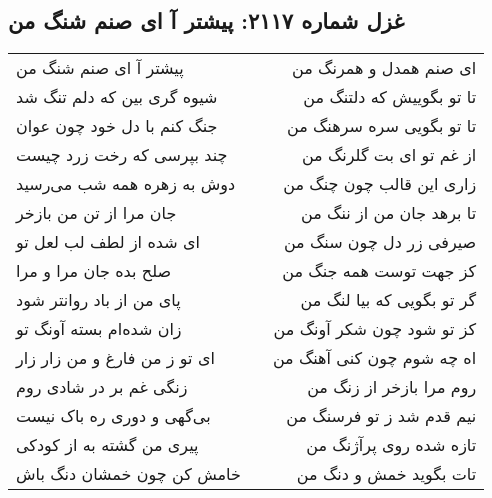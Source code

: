\begin{center}
\section*{غزل شماره ۲۱۱۷: پیشتر آ ای صنم شنگ من}
\label{sec:2117}
\begin{longtable}{l p{0.5cm} r}
پیشتر آ ای صنم شنگ من
&&
ای صنم همدل و همرنگ من
\\
شیوه گری بین که دلم تنگ شد
&&
تا تو بگوییش که دلتنگ من
\\
جنگ کنم با دل خود چون عوان
&&
تا تو بگویی سره سرهنگ من
\\
چند بپرسی که رخت زرد چیست
&&
از غم تو ای بت گلرنگ من
\\
دوش به زهره همه شب می‌رسید
&&
زاری این قالب چون چنگ من
\\
جان مرا از تن من بازخر
&&
تا برهد جان من از ننگ من
\\
ای شده از لطف لب لعل تو
&&
صیرفی زر دل چون سنگ من
\\
صلح بده جان مرا و مرا
&&
کز جهت توست همه جنگ من
\\
پای من از باد روانتر شود
&&
گر تو بگویی که بیا لنگ من
\\
زان شده‌ام بسته آونگ تو
&&
کز تو شود چون شکر آونگ من
\\
ای تو ز من فارغ و من زار زار
&&
اه چه شوم چون کنی آهنگ من
\\
زنگی غم بر در شادی روم
&&
روم مرا بازخر از زنگ من
\\
بی‌گهی و دوری ره باک نیست
&&
نیم قدم شد ز تو فرسنگ من
\\
پیری من گشته به از کودکی
&&
تازه شده روی پرآژنگ من
\\
خامش کن چون خمشان دنگ باش
&&
تات بگوید خمش و دنگ من
\\
\end{longtable}
\end{center}
